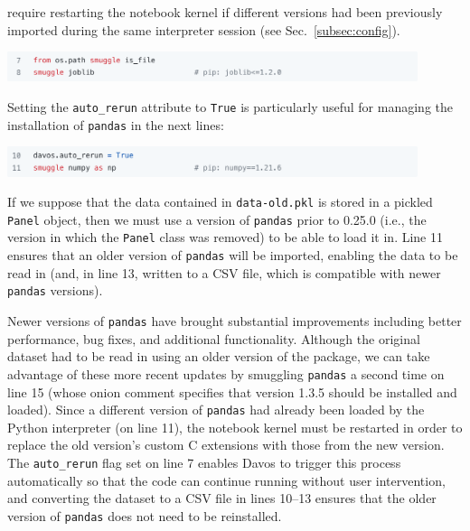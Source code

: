 \documentclass[preprint,12pt,a4paper]{elsarticle}
\begin{document}
require restarting the notebook kernel if different versions had been previously
imported during the same interpreter session (see
Sec.~\ref{subsec:config}).
\begin{center}
\includegraphics[width=0.9\textwidth]{figs/example2}
\end{center}
Setting the \texttt{auto\_rerun} attribute to \texttt{True} is particularly useful
for managing the installation of \texttt{pandas} in the next
lines:
\begin{center}
\includegraphics[width=0.9\textwidth]{figs/example3}
\end{center}
If we suppose that the data contained in \texttt{data-old.pkl} is
stored in a pickled \texttt{Panel} object, then we must use a version of
\texttt{pandas} prior to 0.25.0 (i.e., the version in which the \texttt{Panel}
class was removed) to be able to load it in. Line 11 ensures
that an older version of \texttt{pandas} will be imported, enabling
the data to be read in (and, in line 13, written to a CSV
file, which is compatible with newer \texttt{pandas} versions).

Newer versions of \texttt{pandas} have brought substantial improvements
including better performance, bug fixes, and additional functionality. Although
the original dataset had to be read in using an older version of the package,
we can take advantage of these more recent updates by smuggling \texttt{pandas}
a second time on line 15 (whose onion comment specifies that version 1.3.5
should be installed and loaded). Since a different version of \texttt{pandas}
had already been loaded by the Python interpreter (on line 11), the notebook
kernel must be restarted in order to replace the old version's custom C
extensions with those from the new version. The \texttt{auto\_rerun} flag set
on line 7 enables Davos to trigger this process automatically so that
the code can continue running without user intervention, and converting the
dataset to a CSV file in lines 10--13 ensures that the older version of
\texttt{pandas} does not need to be reinstalled.
\end{document}
